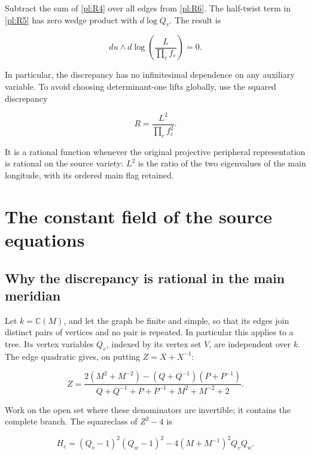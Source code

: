 Subtract the sum of \eqref{pl:R4} over all edges from \eqref{pl:R6}. The half-twist term
in \eqref{pl:R5} has zero wedge product with \(d\log Q_v\). The result is

\begin{equation}\label{pl:R7}
du\wedge d\log\left(\frac{L}{\prod_e f_e}\right)=0.
\end{equation}

In particular, the discrepancy has no infinitesimal dependence on any
auxiliary variable. To avoid choosing determinant-one lifts globally,
use the squared discrepancy

\begin{equation}\label{pl:R8}
R=\frac{L^2}{\prod_e f_e^2}.
\end{equation}

It is a rational function whenever the original projective peripheral
representation is rational on the source variety: \(L^2\) is the
ratio of the two eigenvalues of the main longitude, with its ordered
main flag retained.

\section{The constant field of the source equations}\label{pl:the-constant-field-of-the-source-equations}

\subsection{Why the discrepancy is rational in the main meridian}\label{pl:why-the-discrepancy-is-rational-in-the-main-meridian}

Let \(k=\mathbb C(M)\), and let the graph be finite and simple,
so that its edges join distinct pairs of vertices and no pair is
repeated. In particular this applies to a tree. Its vertex variables
\(Q_v\), indexed by its vertex set \(V\), are independent over
\(k\). The edge quadratic
gives, on putting \(Z=X+X^{-1}\):

\begin{equation}\label{pl:R9}
Z=\frac{2(M^2+M^{-2})-(Q+Q^{-1})(P+P^{-1})}
 {Q+Q^{-1}+P+P^{-1}+M^2+M^{-2}+2}.
\end{equation}

Work on the open set where these denominators are invertible; it
contains the complete branch. The squareclass of \(Z^2-4\) is

\begin{equation}\label{pl:R10}
H_e=(Q_v-1)^2(Q_w-1)^2
                  -4(M+M^{-1})^2Q_vQ_w.
\end{equation}

